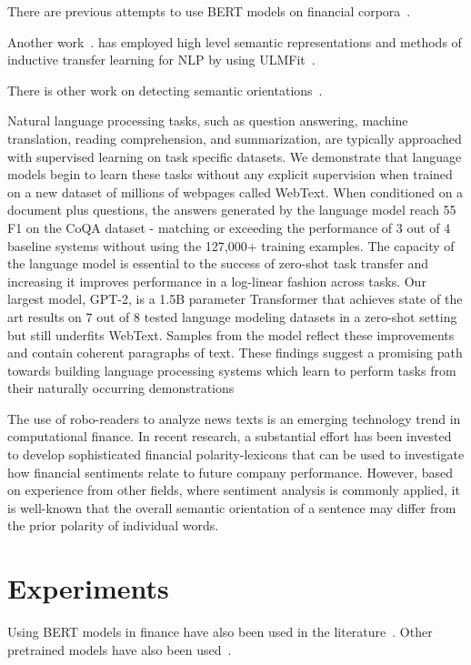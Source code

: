 \documentclass[11pt]{article}
\begin{document}
There are previous attempts to use BERT models on financial
corpora~\cite{araci2019, liu2020, yang2020}.

Another work~\cite{yang2018}. has employed high level semantic representations and methods
of inductive transfer learning for NLP by using ULMFit~\cite{howard2018}.

There is other work on detecting semantic orientations~\cite{malo2014}.

Natural language processing tasks, such as question answering, machine translation, reading comprehension, and summarization, are typically
approached with supervised learning on task specific datasets. We demonstrate that language
models begin to learn these tasks without any explicit supervision when trained on a new dataset
of millions of webpages called WebText. When conditioned on a document plus questions, the answers generated by the language model reach 55
F1 on the CoQA dataset - matching or exceeding the performance of $3$ out of $4$ baseline systems
without using the 127,000+ training examples. The capacity of the language model is essential
to the success of zero-shot task transfer and increasing it improves performance in a log-linear
fashion across tasks. Our largest model, GPT-2, is a 1.5B parameter Transformer that achieves
state of the art results on 7 out of 8 tested language modeling datasets in a zero-shot setting
but still underfits WebText. Samples from the model reflect these improvements and contain coherent paragraphs of text. These findings suggest
a promising path towards building language processing systems which learn to perform tasks from
their naturally occurring demonstrations~\cite{radford2019} 

The use of robo-readers to analyze news texts is an emerging technology trend in computational finance. In recent
research, a substantial effort has been invested to develop sophisticated financial polarity-lexicons that can be used to
investigate how financial sentiments relate to future company performance. However, based on experience from other
fields, where sentiment analysis is commonly applied, it is well-known
that the overall semantic orientation of a sentence may differ from
the prior polarity of individual words.


\section{Experiments}

Using BERT models in finance have also been used in the
literature~\cite{araci2019, yang2020}. Other pretrained models have
also been used~\cite{yang2018}.
\end{document}
